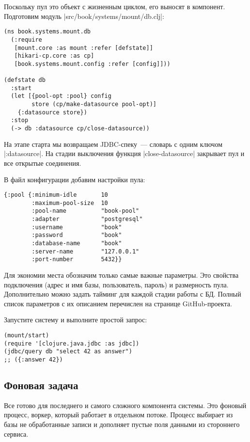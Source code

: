 Поскольку пул это объект с жизненным циклом, его выносят в компонент. Подготовим
модуль \spverb|src/book/systems/mount/db.clj|:

\begin{verbatim}
(ns book.systems.mount.db
  (:require
   [mount.core :as mount :refer [defstate]]
   [hikari-cp.core :as cp]
   [book.systems.mount.config :refer [config]]))

(defstate db
  :start
  (let [{pool-opt :pool} config
        store (cp/make-datasource pool-opt)]
    {:datasource store})
  :stop
  (-> db :datasource cp/close-datasource))
\end{verbatim}

На этапе старта мы возвращаем JDBC-спеку~--- словарь с одним ключом
\spverb|:datasource|. На стадии выключения функция \spverb|close-datasource| закрывает пул и
все открытые соединения.

В файл конфигурации добавим настройки пула:

\begin{verbatim}
{:pool {:minimum-idle       10
        :maximum-pool-size  10
        :pool-name          "book-pool"
        :adapter            "postgresql"
        :username           "book"
        :password           "book"
        :database-name      "book"
        :server-name        "127.0.0.1"
        :port-number        5432}}
\end{verbatim}

Для экономии места обозначим только самые важные параметры. Это свойства
подключения (адрес и имя базы, пользователь, пароль) и размерность
пула. Дополнительно можно задать тайминг для каждой стадии работы с БД. Полный
список параметров с их описанием перечислен на странице GitHub-проекта.

Запустите систему и выполните простой запрос:

\begin{verbatim}
(mount/start)
(require '[clojure.java.jdbc :as jdbc])
(jdbc/query db "select 42 as answer")
;; ({:answer 42})
\end{verbatim}

\subsection{Фоновая задача}

Все готово для последнего и самого сложного компонента системы. Это фоновый
процесс, воркер, который работает в отдельном потоке. Процесс выбирает из базы
не обработанные записи и дополняет пустые поля данными из стороннего сервиса.


